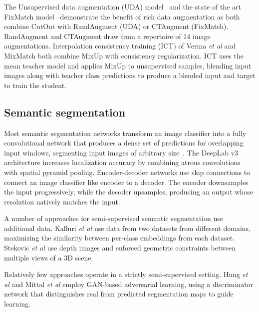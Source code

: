 \documentclass{bmvc2k}
\def\etal{\emph{et al}\bmvaOneDot}
\begin{document}
The Unsupervised data augmentation (UDA) model~\cite{Xie:UDA} and the state of the art FixMatch model~\cite{Sohn:FixMatch}
demonstrate the benefit of rich data augmentation as both combine CutOut \cite{Devries:Cutout} with
RandAugment \cite{Cubuk:RandAugment} (UDA) or CTAugment \cite{Berthelot:ReMixMatch} (FixMatch). RandAugment and CTAugment draw from a repertoire
of 14 image augmentations.
Interpolation consistency training (ICT) of Verma \etal \cite{Verma:ICT} and MixMatch \cite{Berthelot:MixMatch} both combine MixUp \cite{Zhang:MixUp} with consistency regularization. ICT uses the mean teacher model and applies MixUp to unsupervised samples, blending input images along with teacher class predictions to produce a blended input and target to train the student.



\subsection{Semantic segmentation}



Most semantic segmentation networks transform an image classifier into a fully convolutional network that produces a dense set of predictions for overlapping input windows, segmenting input images of arbitrary size~\cite{Long:FCN}. The DeepLab v3~\cite{Chen:DeepLabv3} architecture increases localization accuracy by combining atrous convolutions with spatial pyramid pooling. Encoder-decoder networks \cite{Badrinarayanan:SegNet,Ronneberger:UNet,Li:DenseUNet} use skip connections to connect an image classifier like encoder to a decoder. The encoder downsamples the input progressively, while the decoder upsamples, producing an output whose resolution natively matches the input.


A number of approaches for semi-supervised semantic segmentation use additional data. Kalluri \etal \cite{Kalluri:UnivSemiSupSeg} use data from two datasets from different domains, 
maximizing the similarity between per-class embeddings from each dataset. Stekovic \etal \cite{Stekovic:S4Net} use depth images and enforced geometric constraints between multiple views of a 3D scene.

Relatively few approaches operate in a strictly semi-supervised setting. Hung \etal \cite{Hung:AdvSemiSupSeg} and Mittal \etal \cite{Mittal:SSSHiLow} employ GAN-based adversarial learning,
using a discriminator network that distinguishes real from predicted segmentation maps to guide learning.
\end{document}
